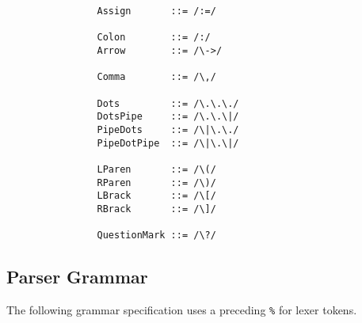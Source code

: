 \documentclass{article}
\begin{document}
\begin{verbatim}
				Assign       ::= /:=/
				
				Colon        ::= /:/
				Arrow        ::= /\->/
				
				Comma        ::= /\,/
				
				Dots         ::= /\.\.\./
				DotsPipe     ::= /\.\.\|/
				PipeDots     ::= /\|\.\./
				PipeDotPipe  ::= /\|\.\|/
				
				LParen       ::= /\(/
				RParen       ::= /\)/
				LBrack       ::= /\[/
				RBrack       ::= /\]/
				
				QuestionMark ::= /\?/
			\end{verbatim}
			
		\subsection{Parser Grammar}
		
			The following grammar specification uses a preceding \texttt{\%} for lexer tokens.
		
\end{document}
